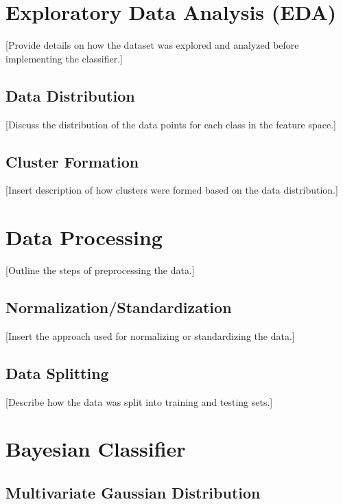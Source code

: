 \documentclass[conference]{IEEEtran}
\begin{document}
	\section{Exploratory Data Analysis (EDA)}
	
	[Provide details on how the dataset was explored and analyzed before implementing the classifier.]
	
	\subsection{Data Distribution}
	
	[Discuss the distribution of the data points for each class in the feature space.]
	
	\subsection{Cluster Formation}
	
	[Insert description of how clusters were formed based on the data distribution.]
	
	\section{Data Processing}
	
	[Outline the steps of preprocessing the data.]
	
	\subsection{Normalization/Standardization}
	
	[Insert the approach used for normalizing or standardizing the data.]
	
	\subsection{Data Splitting}
	
	[Describe how the data was split into training and testing sets.]
	
	\section{Bayesian Classifier}
	
	\subsection{Multivariate Gaussian Distribution}
	
\end{document}
